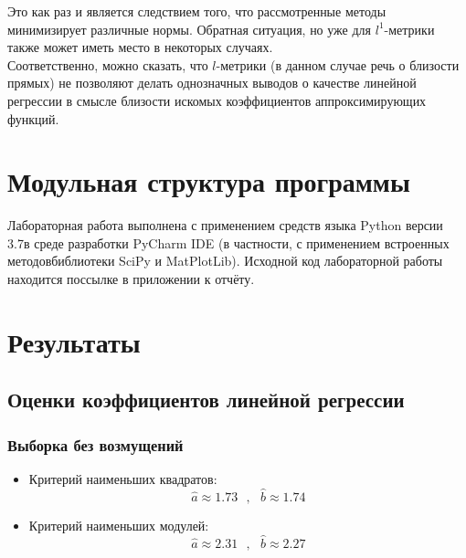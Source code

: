 \documentclass[a4paper]{article}
\begin{document}
    Это как раз и является следствием того, что рассмотренные методы минимизирует различные нормы. Обратная ситуация, но уже для $l^1$-метрики также может иметь место в некоторых случаях.\\
    
    Соответственно, можно сказать, что $l$-метрики (в данном случае речь о близости прямых) не позволяют делать однозначных выводов о качестве линейной регрессии в смысле близости искомых коэффициентов аппроксимирующих функций.\\
    
\section{Модульная структура программы}

Лабораторная работа выполнена с применением средств языка Python версии 3.7в среде разработки PyCharm IDE (в частности, с применением встроенных методовбиблиотеки SciPy и MatPlotLib). Исходной код лабораторной работы находится поссылке в приложении к отчёту.

\section{Результаты}

    \subsection{Оценки коэффициентов линейной регрессии}
    
        \subsubsection{Выборка без возмущений}
        
        \begin{itemize}
            \item Критерий наименьших квадратов:
            \begin{equation} \label{mnk without noises}
                \widehat{a} \approx 1.73 \text{ }, \text{ } \widehat{b} \approx 1.74
            \end{equation}
            
            \item Критерий наименьших модулей:
            \begin{equation} \label{mnm without noises}
                \widehat{a} \approx 2.31 \text{ }, \text{ } \widehat{b} \approx 2.27
            \end{equation}
            
        \end{itemize}
        
\end{document}
